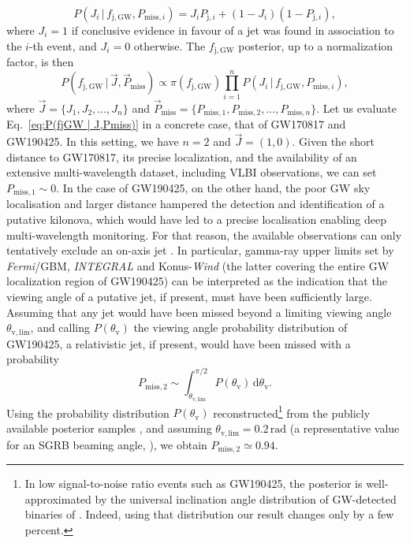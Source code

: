 \documentclass[]{aa}
\newcommand{\resp}[1]{#1}
\begin{document}
\begin{appendix}
\begin{equation}
 P(J_i\,|\,f_\mathrm{j,GW},P_{\mathrm{miss},i}) = J_i P_{\mathrm{j},i} + (1-J_i) (1-P_{\mathrm{j},i}),
\end{equation}
where $J_i=1$ if conclusive evidence in favour of a jet was found in association to the $i$-th event, and $J_i=0$ otherwise.
The $f_\mathrm{j,GW}$ posterior, up to a normalization factor, is then
\begin{equation}
 P(f_\mathrm{j,GW}\,|\,\vec J,\vec P_\mathrm{miss}) \propto \pi(f_\mathrm{j,GW})\prod_{i=1}^{n} P(J_i\,|\,f_\mathrm{j,GW},P_{\mathrm{miss},i}),
 \label{eq:P(fjGW | J,Pmiss)} 
\end{equation}
where $\vec J=\lbrace J_1,J_2,...,J_n\rbrace$ and $\vec P_\mathrm{miss}=\lbrace P_{\mathrm{miss},1},P_{\mathrm{miss},2},...,P_{\mathrm{miss},n}\rbrace$.
Let us evaluate Eq.~\ref{eq:P(fjGW | J,Pmiss)} in a concrete case, that of GW170817 and GW190425. In this setting, we have $n=2$ and $\vec J=(1,0)$. Given the short distance to GW170817, its precise localization, and the availability of an extensive multi-wavelength dataset, including VLBI observations, we can set $P_{\mathrm{miss},1}\sim 0$. In the case of GW190425, on the other hand, \resp{the poor GW sky localisation and larger distance hampered the detection and identification of a putative kilonova, which would have led to a precise localisation enabling deep multi-wavelength monitoring. For that reason,} the available observations can only tentatively exclude an on-axis jet \citep{Hosseinzadeh2019}. In particular, gamma-ray upper limits set by \textit{Fermi}/GBM, \textit{INTEGRAL} and Konus-\textit{Wind} (the latter covering the entire GW localization region of GW190425) can be interpreted as the indication that the viewing angle of a putative jet, if present, must have been sufficiently large. Assuming that any jet would have been missed beyond a limiting viewing angle $\theta_\mathrm{v,lim}$, and calling $P(\theta_\mathrm{v})$ the viewing angle probability distribution of GW190425, a relativistic jet, if present, would have been missed with a probability
\begin{equation}
 P_{\mathrm{miss},2} \sim \int_{\theta_\mathrm{v,lim}}^{\pi/2} P(\theta_\mathrm{v})\,\mathrm{d}\theta_\mathrm{v}.
 \label{eq:Pmiss}
\end{equation}
Using the probability distribution $P(\theta_\mathrm{v})$ reconstructed\footnote{In low signal-to-noise ratio events such as GW190425, the posterior is well-approximated by the universal inclination angle distribution of GW-detected binaries of \citet{Schutz2011}. Indeed, using that distribution our result changes only by a few percent.} from the publicly available posterior samples \citep{Abbott2020_GW190425}, and assuming $\theta_\mathrm{v,lim}=0.2\,\mathrm{rad}$ (a representative value for an SGRB beaming angle, \citealt{Fong2015}), we obtain $P_{\mathrm{miss},2}\simeq 0.94$. 

\end{appendix}
\end{document}
